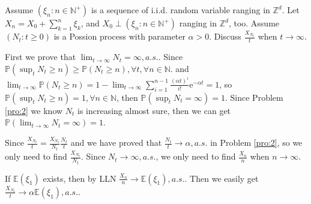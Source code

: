 \documentclass{ctexart}
\begin{document}
\begin{problem}\label{pro:5}
  Assume \((\xi_n:n \in \mathbb{N}^+)\) is a sequence of i.i.d. random variable ranging in \(\mathbb{Z}^d\).
  Let \(X_n=X_0 + \sum_{k=1}^{n}\xi_k\), and \(X_0 \perp (\xi_n:n \in \mathbb{N}^+)\) ranging in \(\mathbb{Z}^d\), too.
  Assume \((N_t:t \geq 0)\) is a Possion process with parameter \(\alpha>0\).
  Discuss \(\frac{X_{N_t}}{t}\) when \(t \to \infty\).
\end{problem}
\begin{solution}
  First we prove that \(\lim_{t \to \infty}N_t=\infty,a. s.\).
  Since \(\mathbb{P}(\sup_{t}N_t \geq n)\geq \mathbb{P}(N_t \geq n),\forall t ,\forall n \in \mathbb{N}\).
  and \(\lim_{t \to \infty}\mathbb{P}(N_t \geq n)=1- \lim_{t \to \infty}\sum_{i=1}^{n-1} \frac{(\alpha t)^i}{i!}\mathrm{e}^{-\alpha t}=1 \), so \(\mathbb{P}(\sup_{t}N_t \geq n)=1,\forall n \in \mathbb{N}\),
  then \(\mathbb{P}(\sup_{t}N_t=\infty)=1\).
  Since Problem \ref{pro:2} we know \(N_t\) is increasing almost sure,
  then we can get \(\mathbb{P}(\lim_{t \to \infty}N_t = \infty)=1\).

  Since \(\frac{X_{N_t}}{t}=\frac{X_{N_t}}{N_t} \frac{N_t}{t}\) and we have proved that \(\frac{N_t}{t} \to \alpha,a. s.\) in Problem \ref{pro:2},
  so we only need to find \(\frac{X_{N_t}}{N_t}\).
  Since \(N_t \to \infty,a. s.\), we only need to find \(\frac{X_n}{n}\) when \(n \to \infty\).

  If \(\mathbb{E}(\xi_1)\) exists, then by LLN \(\frac{X_n}{n} \to \mathbb{E}(\xi_1),a. s.\).
  Then we easily get \(\frac{X_{N_t}}{t} \to \alpha \mathbb{E}(\xi_1),a. s.\).
\end{solution}
\end{document}
